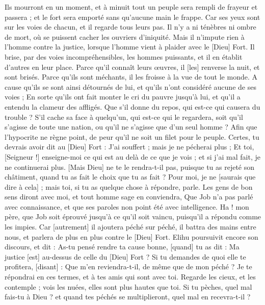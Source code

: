 \begin{multicols}{2}
Ils mourront en un moment, et à minuit tout un peuple sera rempli de frayeur et passera ; et le fort sera emporté sans qu'aucune main le frappe.
Car ses yeux sont sur les voies de chacun, et il regarde tous leurs pas.
Il n'y a ni ténèbres ni ombre de mort, où se puissent cacher les ouvriers d'iniquité.
Mais il n'impute rien à l'homme contre la justice, lorsque l'homme vient à plaider avec le [Dieu] Fort.
Il brise, par des voies incompréhensibles, les hommes puissants, et il en établit d'autres en leur place.
Parce qu'il connaît leurs œuvres, il [les] renverse la nuit, et sont brisés.
Parce qu'ils sont méchants, il les froisse à la vue de tout le monde.
A cause qu'ils se sont ainsi détournés de lui, et qu'ils n'ont considéré aucune de ses voies ;
En sorte qu'ils ont fait monter le cri du pauvre jusqu'à lui, et qu'il a entendu la clameur des affligés.
Que s'il donne du repos, qui est-ce qui causera du trouble ? S'il cache sa face à quelqu'un, qui est-ce qui le regardera, soit qu'il s'agisse de toute une nation, ou qu'il ne s'agisse que d'un seul homme ?
Afin que l'hypocrite ne règne point, de peur qu'il ne soit un filet pour le peuple.
Certes, tu devrais avoir dit au [Dieu] Fort : J'ai souffert ; mais je ne pécherai plus ;
Et toi, [Seigneur !] enseigne-moi ce qui est au delà de ce que je vois ; et si j'ai mal fait, je ne continuerai plus.
[Mais Dieu] ne te le rendra-t-il pas, puisque tu as rejeté son châtiment, quand tu as fait le choix que tu as fait ? Pour moi, je ne [saurais que dire à cela] ; mais toi, si tu as quelque chose à répondre, parle.
Les gens de bon sens diront avec moi, et tout homme sage en conviendra,
Que Job n'a pas parlé avec connaissance, et que ses paroles non point été avec intelligence.
Ha ! mon père, que Job soit éprouvé jusqu'à ce qu'il soit vaincu, puisqu'il a répondu comme les impies.
Car [autrement] il ajoutera péché sur péché, il battra des mains entre nous, et parlera de plus en plus contre le [Dieu] Fort.
\VerseOne{}Elihu poursuivit encore son discours, et dit :
As-tu pensé rendre ta cause bonne, [quand] tu as dit : Ma justice [est] au-dessus de celle du [Dieu] Fort ?
Si tu demandes de quoi elle te profitera, [disant] : Que m'en reviendra-t-il, de même que de mon péché ?
Je te répondrai en ces termes, et à tes amis qui sont avec toi.
Regarde les cieux, et les contemple ; vois les nuées, elles sont plus hautes que toi.
Si tu pèches, quel mal fais-tu à Dieu ? et quand tes péchés se multiplieront, quel mal en recevra-t-il ?

\end{multicols}
